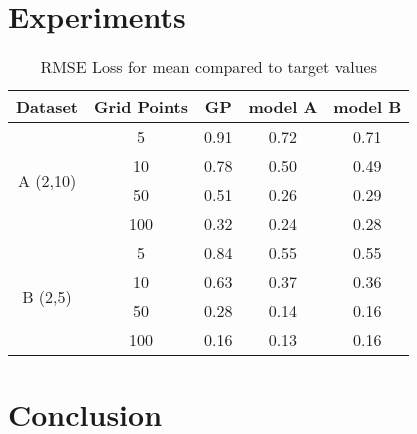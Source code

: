 \section{Experiments}
\label{exp:experiments}

	\begin{figure}
	\centering
	\resizebox{!}{0.40\textheight}{
		
		
	}
	\resizebox{!}{0.40\textheight}{
		
		
	}
\end{figure}

	\begin{figure}
	\centering
	\resizebox{0.95\textwidth}{!}{
		
		
	}
\end{figure}

	\begin{figure}
	\centering
	\resizebox{0.95\textwidth}{!}{
		
		
	}
\end{figure}

	\begin{table}[]
	\caption{RMSE Loss for mean compared to target values}
	\begin{tabular}{c c c c c}
		\toprule
		Dataset & Grid Points & GP & model A & model B\\
		\midrule
		\multirow{4}{*}{A (2,10)} & 5 & 0.91 & 0.72 & 0.71\\
		&10& 0.78 & 0.50 & 0.49\\ 
		&50 & 0.51 & 0.26 & 0.29\\
		&100 & 0.32 & 0.24 & 0.28\\\midrule
		\multirow{4}{*}{B (2,5)} & 5 & 0.84 & 0.55 & 0.55\\
		& 10 & 0.63 & 0.37 & 0.36\\
		& 50 & 0.28 & 0.14 & 0.16\\
		& 100 & 0.16 & 0.13 & 0.16\\\bottomrule
	\end{tabular}
\end{table}

	\begin{figure}
	\centering
	\resizebox{0.95\textwidth}{!}{
		
		
	}
\end{figure}

	\begin{figure}
	\centering
	\resizebox{!}{0.40\textheight}{
		
		
	}
	\resizebox{!}{0.40\textheight}{
		
		
	}
\end{figure}

\section{Conclusion}
\label{exp:conclusion}
